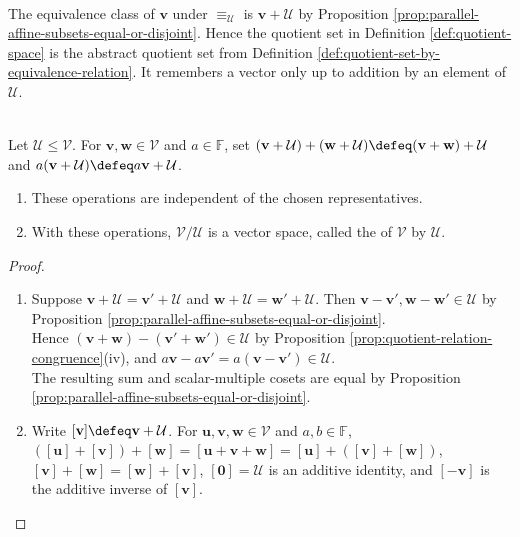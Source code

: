 \begin{perspective} \label{per:quotient-cosets-as-equivalence-classes} \\
The equivalence class of $\mathbf{v}$ under $\equiv_{\mathcal{U}}$ is $\mathbf{v}+\mathcal{U}$ by Proposition \ref{prop:parallel-affine-subsets-equal-or-disjoint}. Hence the quotient set in Definition \ref{def:quotient-space} is the abstract quotient set from Definition \ref{def:quotient-set-by-equivalence-relation}. It remembers a vector only up to addition by an element of $\mathcal{U}$.
\end{perspective}

\begin{proposition} \label{prop:quotient-space-structure} \\
Let $\mathcal{U}\leq\mathcal{V}$. For $\mathbf{v},\mathbf{w}\in\mathcal{V}$ and $a\in\mathbb{F}$, set $(\mathbf{v}+\mathcal{U})+(\mathbf{w}+\mathcal{U})\defeq(\mathbf{v}+\mathbf{w})+\mathcal{U}$ and $a(\mathbf{v}+\mathcal{U})\defeq a\mathbf{v}+\mathcal{U}$.
\begin{enumerate}[label=(\roman*)]
\setlength{\itemsep}{0pt}
\item These operations are independent of the chosen representatives.
\item With these operations, $\mathcal{V}/\mathcal{U}$ is a vector space, called the  of $\mathcal{V}$ by $\mathcal{U}$.
\end{enumerate}
\begin{proof}
\begin{enumerate}[label=(\roman*)]
\setlength{\itemsep}{0pt}
\item Suppose $\mathbf{v}+\mathcal{U}=\mathbf{v}'+\mathcal{U}$ and $\mathbf{w}+\mathcal{U}=\mathbf{w}'+\mathcal{U}$. Then $\mathbf{v}-\mathbf{v}',\mathbf{w}-\mathbf{w}'\in\mathcal{U}$ by Proposition \ref{prop:parallel-affine-subsets-equal-or-disjoint}.\\
Hence $(\mathbf{v}+\mathbf{w})-(\mathbf{v}'+\mathbf{w}')\in\mathcal{U}$ by Proposition \ref{prop:quotient-relation-congruence}(iv), and $a\mathbf{v}-a\mathbf{v}'=a(\mathbf{v}-\mathbf{v}')\in\mathcal{U}$.\\
The resulting sum and scalar-multiple cosets are equal by Proposition \ref{prop:parallel-affine-subsets-equal-or-disjoint}.
\item Write $[\mathbf{v}]\defeq\mathbf{v}+\mathcal{U}$. For $\mathbf{u},\mathbf{v},\mathbf{w}\in\mathcal{V}$ and $a,b\in\mathbb{F}$, $([\mathbf{u}]+[\mathbf{v}])+[\mathbf{w}]=[\mathbf{u}+\mathbf{v}+\mathbf{w}]=[\mathbf{u}]+([\mathbf{v}]+[\mathbf{w}])$, $[\mathbf{v}]+[\mathbf{w}]=[\mathbf{w}]+[\mathbf{v}]$, $[\mathbf{0}]=\mathcal{U}$ is an additive identity, and $[-\mathbf{v}]$ is the additive inverse of $[\mathbf{v}]$.\\

\end{enumerate}
\end{proof}
\end{proposition}
